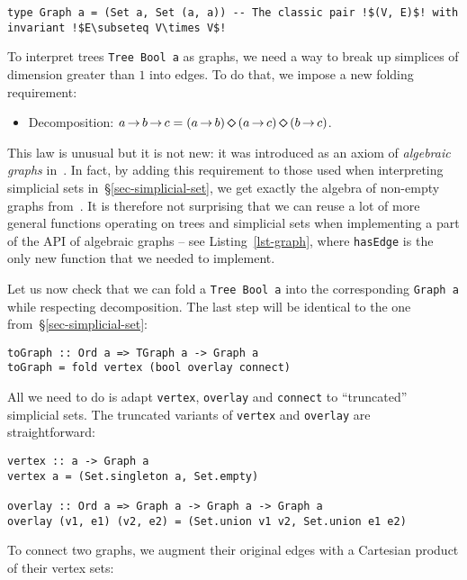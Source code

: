 \documentclass[english,submission]{programming}
\newcommand{\hcode}[1]{{\color{darkblue} \lstinline[keywordstyle={}]|#1|}} %
\newcommand{\dia}{\,\text{\raisebox{-0.3mm}{\Large $\diamond$}}\,}
\newcommand{\arr}{\,\text{$\rightarrow$}\,}
\begin{document}
\begin{lstlisting}
type Graph a = (Set a, Set (a, a)) -- The classic pair !$(V, E)$! with invariant !$E\subseteq V\times V$!
\end{lstlisting}

\noindent
To interpret trees \hcode{Tree Bool a} as graphs, we need a way to break up
simplices of dimension greater than $1$ into edges. To do that, we impose a new
folding requirement:

\begin{itemize}
    \item Decomposition:
          $a \arr b \arr c = (a \arr b) \dia (a \arr c) \dia (b \arr c)$.
\end{itemize}

\noindent
This law is unusual but it is not new: it was introduced as an axiom of
\emph{algebraic graphs} in~\cite{mokhov_alga}. In fact, by adding this
requirement to those used when interpreting simplicial sets
in~\S\ref{sec-simplicial-set}, we get exactly the algebra of non-empty graphs
from~\cite{mokhov_alga}. It is therefore not surprising that we can reuse a lot
of more general functions operating on trees and simplicial sets when
implementing a part of the API of algebraic graphs -- see
Listing~\ref{lst-graph}, where \hcode{hasEdge} is the only new function that we
needed to implement.

Let us now check that we can fold a \hcode{Tree Bool a} into the corresponding
\hcode{Graph a} while respecting decomposition. The last step will be identical
to the one from~\S\ref{sec-simplicial-set}:

\begin{lstlisting}
toGraph :: Ord a => TGraph a -> Graph a
toGraph = fold vertex (bool overlay connect)
\end{lstlisting}

\noindent
All we need to do is adapt \hcode{vertex}, \hcode{overlay} and \hcode{connect}
to ``truncated'' simplicial sets. The truncated variants of \hcode{vertex} and
\hcode{overlay} are straightforward:

\begin{lstlisting}
vertex :: a -> Graph a
vertex a = (Set.singleton a, Set.empty)

overlay :: Ord a => Graph a -> Graph a -> Graph a
overlay (v1, e1) (v2, e2) = (Set.union v1 v2, Set.union e1 e2)
\end{lstlisting}

\noindent
To connect two graphs, we augment their original edges with a Cartesian product
of their vertex sets:
\end{document}
